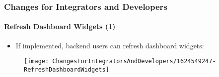 %

\begin{frame}[fragile]
	\frametitle{Changes for Integrators and Developers}
	\framesubtitle{Refresh Dashboard Widgets (1)}


	\begin{itemize}
		\item If implemented, backend users can refresh dashboard widgets:
	\end{itemize}

	\begin{figure}
		\texttt{[image: ChangesForIntegratorsAndDevelopers/1624549247-RefreshDashboardWidgets]}
	\end{figure}

\end{frame}

